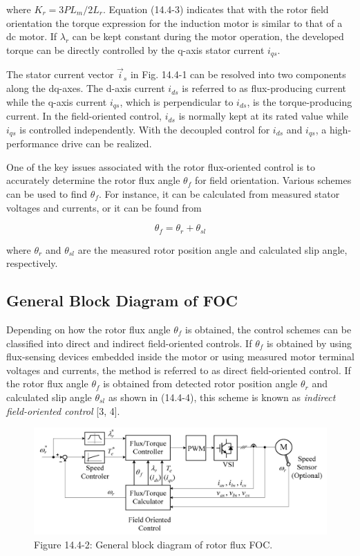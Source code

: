 \documentclass[letterpaper,12pt]{article}
\begin{document}
where $K_r = 3PL_m/2L_r$. Equation (14.4-3) indicates that with the rotor field orientation the torque expression for the induction motor is similar to that of a dc motor. If $\lambda_r$ can be kept constant during the motor operation, the developed torque can be directly controlled by the q-axis stator current $i_{qs}$.

The stator current vector $\vec{i}_s$ in Fig. 14.4-1 can be resolved into two components along the dq-axes. The d-axis current $i_{ds}$ is referred to as flux-producing current while the q-axis current $i_{qs}$, which is perpendicular to $i_{ds}$, is the torque-producing current. In the field-oriented control, $i_{ds}$ is normally kept at its rated value while $i_{qs}$ is controlled independently. With the decoupled control for $i_{ds}$ and $i_{qs}$, a high-performance drive can be realized.

One of the key issues associated with the rotor flux-oriented control is to accurately determine the rotor flux angle $\theta_f$ for field orientation. Various schemes can be used to find $\theta_f$. For instance, it can be calculated from measured stator voltages and currents, or it can be found from

\begin{equation}
\theta_f = \theta_r + \theta_{sl} \tag{14.4-4}
\end{equation}

where $\theta_r$ and $\theta_{sl}$ are the measured rotor position angle and calculated slip angle, respectively.

\subsection{General Block Diagram of FOC}

Depending on how the rotor flux angle $\theta_f$ is obtained, the control schemes can be classified into direct and indirect field-oriented controls. If $\theta_f$ is obtained by using flux-sensing devices embedded inside the motor or using measured motor terminal voltages and currents, the method is referred to as direct field-oriented control. If the rotor flux angle $\theta_f$ is obtained from detected rotor position angle $\theta_r$ and calculated slip angle $\theta_{sl}$ as shown in (14.4-4), this scheme is known as \textit{indirect field-oriented control} [3, 4].

\begin{figure}[h]
\centering
\includegraphics{graficos/img12.jpg}
\caption{Figure 14.4-2: General block diagram of rotor flux FOC.}
\end{figure}
\FloatBarrier
\end{document}
